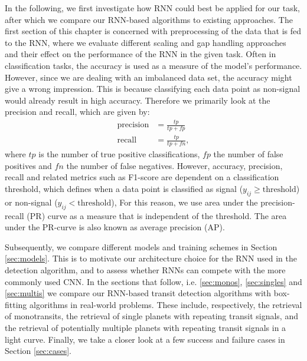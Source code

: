 In the following, we first investigate how RNN could best be applied for our task, after which we compare our RNN-based algorithms to existing approaches. The first section of this chapter is concerned with preprocessing of the data that is fed to the RNN, where we evaluate different scaling and gap handling approaches and their effect on the performance of the RNN in the given task. Often in classification tasks, the accuracy is used as a measure of the model's performance. However, since we are dealing with an imbalanced data set, the accuracy might give a wrong impression. This is because classifying each data point as non-signal would already result in high accuracy. Therefore we primarily look at the precision and recall, which are given by:
\begin{align}
    \text{precision} &= \frac{tp}{tp + fp}\\
    \text{recall} &= \frac{tp}{tp + fn},
\end{align}
where $tp$ is the number of true positive classifications, $fp$ the number of false positives and $fn$ the number of false negatives.  However, accuracy, precision, recall and related metrics such as F1-score are dependent on a classification threshold, which defines when a data point is classified as signal ($y_{ij} \geq \text{threshold}$) or non-signal ($y_{ij} < \text{threshold}$), For this reason, we use area under the precision-recall (PR) curve as a measure that is independent of the threshold. The area under the PR-curve is also known as average precision (AP). 

Subsequently, we compare different models and training schemes in Section \ref{sec:models}. This is to motivate our architecture choice for the RNN used in the detection algorithm, and to assess whether RNNs can compete with the more commonly used CNN. In the sections that follow, i.e. \ref{sec:monos}, \ref{sec:singles} and \ref{sec:multis} we compare our RNN-based transit detection algorithms with box-fitting algorithms in real-world problems. These include, respectively, the retrieval of monotransits, the retrieval of single planets with repeating transit signals, and the retrieval of potentially multiple planets with repeating transit signals in a light curve. Finally, we take a closer look at a few success and failure cases in Section \ref{sec:cases}.
